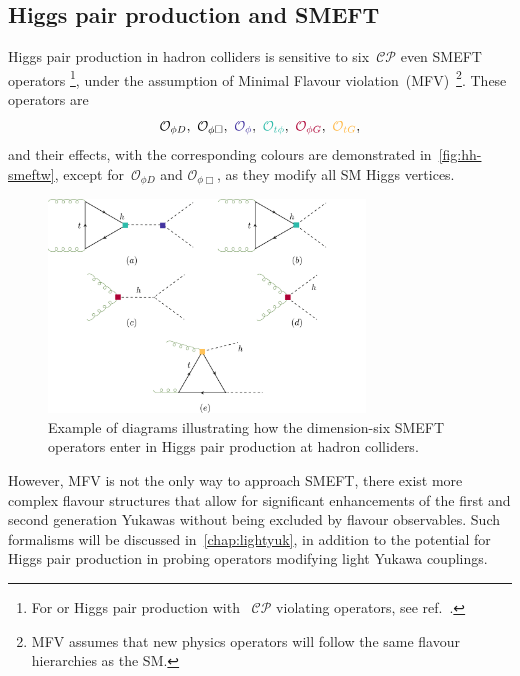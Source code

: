\subsection{Higgs pair production and SMEFT}
Higgs pair production in hadron colliders is sensitive to six~$\mathcal{CP}$ even SMEFT operators \footnote{For or Higgs pair production with ~$\mathcal{CP}$ violating operators, see ref.~\cite{Grober:2017gut}. }, under the assumption of Minimal Flavour violation~(MFV)~\footnote{MFV assumes that new physics operators will follow the same flavour hierarchies as the SM. }. These operators are
	\begin{equation}
	\mathcal{O}_{\phi D},\ \mathcal{O}_{\phi \Box},\ \textcolor[HTML]{4334a0}{\mathcal{O}_{\phi}}, \ 	\textcolor[HTML]{2ebbaa}{\mathcal{O}_{t\phi}}, \ 	\textcolor[HTML]{ae0034}{\mathcal{O}_{\phi G}},\ \textcolor[HTML]{ffb743}{\mathcal{O}_{t G}},
	\label{HH-smeft}
\end{equation}
and their effects, with the corresponding colours are demonstrated in~\autoref{fig:hh-smeftw}, except for~$\mathcal{O}_{\phi D}$ and  $\mathcal{O}_{\phi \Box}$, as they modify all SM Higgs vertices. 
\begin{figure}[t!]
	\begin{center}
			\includegraphics[width=0.75\textwidth]{figures/hh-smeft}
			\caption{ Example of diagrams illustrating how the dimension-six SMEFT operators enter in Higgs pair production at hadron colliders. \label{fig:hh-smeftw} }
		\end{center}
\end{figure}
However, MFV is not the only way to approach SMEFT, there exist more complex flavour structures that allow for significant enhancements of the first and second generation Yukawas without being excluded by flavour observables. Such formalisms will be discussed in~\autoref{chap:lightyuk}, in addition to  the potential for Higgs pair production in probing operators modifying light Yukawa couplings. 
